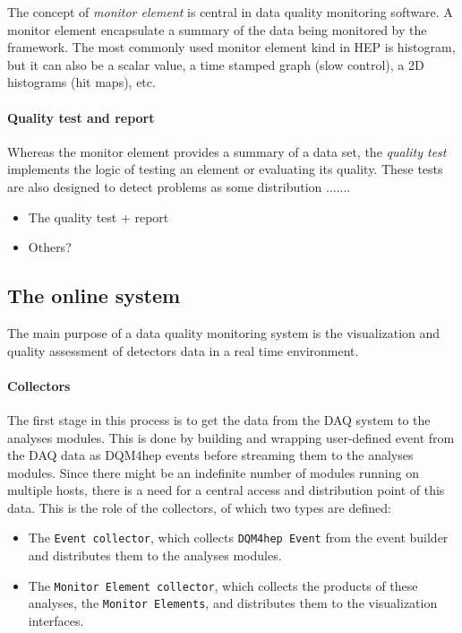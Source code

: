 \documentclass{webofc}
\begin{document}
The concept of \textit{monitor element} is central in data quality monitoring software.
A monitor element encapsulate a summary of the data being monitored by the framework.
The most commonly used monitor element kind in HEP is histogram, but it can also be a scalar value, a time stamped graph (slow control), a 2D histograms (hit maps), etc. 

\paragraph{Quality test and report}

Whereas the monitor element provides a summary of a data set, the \textit{quality test} implements the logic of testing an element or evaluating its quality. These tests are also designed to detect problems as some distribution .......


\begin{itemize}
  \item The quality test + report
  \item Others?
\end{itemize}

\subsection{The online system}
\label{subsec:online}
The main purpose of a data quality monitoring system is the visualization and quality assessment of detectors data in a real time environment.

\paragraph{Collectors}\label{par:Collectors}
The first stage in this process is to get the data from the DAQ system to the analyses modules.
This is done by building and wrapping user-defined event from the DAQ data as DQM4hep events before streaming them to the analyses modules.
Since there might be an indefinite number of modules running on multiple hosts, there is a need for a central access and distribution point of this data. This is the role of the collectors, of which two types are defined:

\begin{itemize}
  \item The \texttt{Event collector}, which collects \texttt{DQM4hep Event} from the event builder and distributes them to the analyses modules. 
  \item The \texttt{Monitor Element collector}, which collects the products of these analyses, the \texttt{Monitor Elements}, and distributes them to the visualization interfaces.
\end{itemize}
\end{document}
